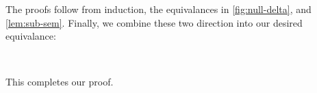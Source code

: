 %
The proofs follow from induction, the equivalances in \cref{fig:null-delta}, and
\cref{lem:sub-sem}.  Finally, we combine these two direction into our desired
equivalance:
%
\begin{code}%
%
\>[4]\AgdaSpace{}%
\AgdaSymbol{\{}\AgdaSpace{}%
\AgdaSymbol{=}\AgdaSpace{}%
\AgdaSymbol{\}}\AgdaSpace{}%
\AgdaSymbol{=}\<%
\\
\>[4][@{}l@{\AgdaIndent{0}}]%
\>[8]\AgdaSpace{}%
\AgdaSymbol{(}\AgdaSpace{}%
\AgdaSpace{}%
\AgdaSpace{}%
\AgdaSpace{}%
\AgdaSpace{}%
\AgdaSymbol{)}\AgdaSpace{}%
\AgdaSymbol{(}\AgdaSpace{}%
\AgdaSpace{}%
\AgdaSpace{}%
\AgdaSpace{}%
\AgdaSpace{}%
\AgdaSymbol{)}\<%
\end{code}
%
This completes our proof.

